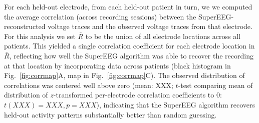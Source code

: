 \documentclass[11pt]{article}
\begin{document}
For each held-out electrode, from each held-out patient in turn, we we
computed the average correlation (across recording sessions) between
the SuperEEG-reconstructed voltage traces and the observed voltage
traces from that electrode.  For this analysis we set $\bar{R}$ to be
the union of all electrode locations across all patients.  This
yielded a single correlation coefficient for each electrode location
in $\bar{R}$, reflecting how well the SuperEEG algorithm was able to
recover the recording at that location by incorporating data across
patients (black histogram in Fig.~\ref{fig:corrmap}A, map in
Fig.~\ref{fig:corrmap}C).  The observed distribution of correlations
was centered well above zero (mean: XXX; $t$-test comparing mean of
distribution of $z$-transformed per-electrode correlation coefficients
to 0: $t(XXX) = XXX, p = XXX$), indicating that the SuperEEG algorithm
recovers held-out activity patterns substantially better than random
guessing.
\end{document}
